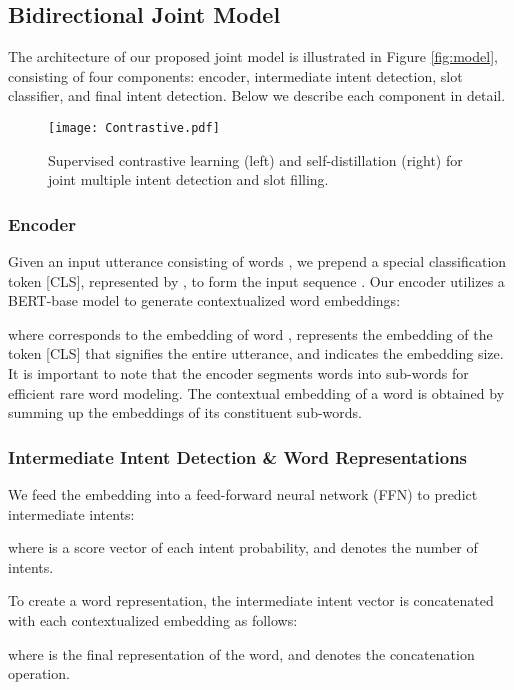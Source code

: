 \documentclass{ecai}
\begin{document}
\subsection{Bidirectional Joint Model}
The architecture of our proposed joint model is illustrated in Figure \ref{fig:model}, consisting of four components: encoder, intermediate intent detection, slot classifier, and final intent detection. Below we describe each component in detail. 

\begin{figure*}[t]
	\begin{center}
		\texttt{[image: Contrastive.pdf]}
	\end{center}
	\vspace{-8pt}
		\caption{Supervised contrastive learning (left) and self-distillation (right) for joint multiple intent detection and slot filling.}
	\label{fig:loss}
\end{figure*}

\subsubsection{Encoder}
Given an input utterance consisting of  words , we prepend a special classification token [CLS], represented by , to form the input sequence . Our encoder utilizes a BERT-base model \cite{Devlin:2019} to generate contextualized word embeddings:

where   corresponds to the embedding of word ,  represents the embedding of the token [CLS] that signifies the entire utterance, and  indicates the embedding size. It is important to note that the encoder segments words into sub-words for efficient rare word modeling. The contextual embedding of a word is obtained by summing up the embeddings of its constituent sub-words.

\subsubsection{Intermediate Intent Detection \& Word Representations}
We feed the embedding  into a feed-forward neural network (FFN) to predict intermediate intents: 

where  is a score vector of each intent probability, and  denotes the number of intents. 

To create a word representation, the intermediate intent vector  is concatenated with each contextualized embedding  as follows:

where  is the final representation of the  word, and  denotes the concatenation operation.
\end{document}
